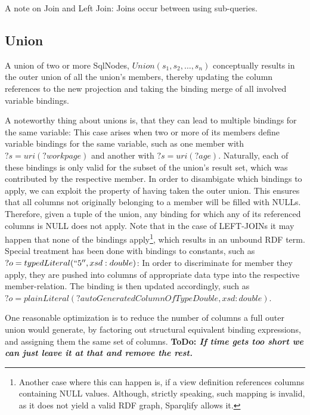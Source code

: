 \documentclass[a4paper,twoside,bibtotoc,abstracton,12pt,BCOR=15mm]{scrreprt}
\newcommand{\todo}[1]{\textbf{ToDo: \textit{#1}}}
\begin{document}
A note on Join and Left Join: Joins occur between using sub-queries.


\subsection{Union}
A union of two or more SqlNodes, $Union(s_1, s_2, \ldots, s_n)$ conceptually results in the outer union of all
the union's members, thereby updating the column references to the new projection and taking the binding merge of all involved variable bindings.

A noteworthy thing about unions is, that they can lead to multiple bindings for the same variable:
This case arises when two or more of its members define variable bindings for the same variable, such as one member with $?s = uri(?workpage)$ and another with $?s = uri(?age)$.
Naturally, each of these bindings is only valid for the subset of the union's result set, which was contributed by the respective member.
In order to disambigate which bindings to apply, we can exploit the property of having taken the outer union. This ensures that all columns not originally belonging to a member will be filled with NULLs.
Therefore, given a tuple of the union, any binding for which any of its referenced columns is NULL does not apply. Note that in the case of LEFT-JOINs it may happen that none of the bindings
apply\footnote{Another case where this can happen is, if a view definition references columns containing NULL values. Although, strictly speaking, such mapping is invalid, as it does not yield a valid RDF graph, Sparqlify allows it.}, which
results in an unbound RDF term.
Special treatment has been done with bindings to constants, such as $?o = typedLiteral(``5'', xsd:double)$: In order to discriminate for member they apply,
they are pushed into columns of appropriate data type into the respective member-relation. The binding is then updated accordingly, such as $?o = plainLiteral(?autoGeneratedColumnOfTypeDouble, xsd:double)$.


One reasonable optimization is to reduce the number of columns a full outer union would generate, by factoring out structural equivalent binding expressions, and assigning them the same set of columns.
\todo{If time gets too short we can just leave it at that and remove the rest.}
\end{document}
